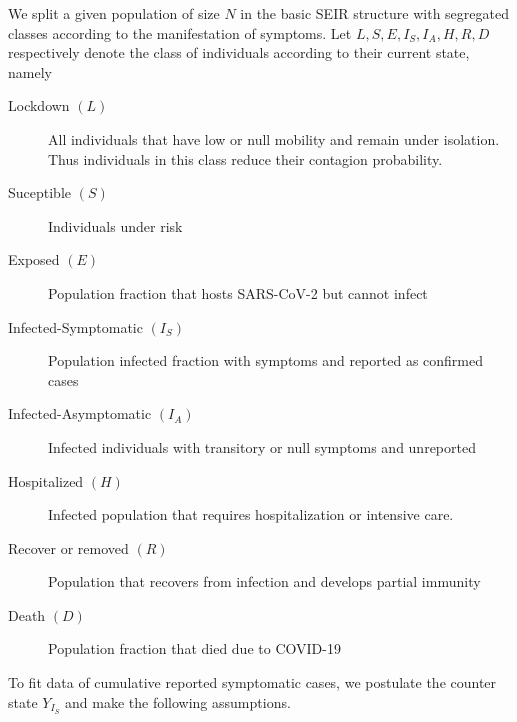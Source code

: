     We split a given population of size $N$ in the basic SEIR
structure with segregated classes according to the manifestation
of symptoms. Let $L, S, E, I_S, I_A, H, R, D$ respectively denote the
class of individuals according to their current state, namely
%
\begin{description}
    \item[Lockdown $(L)$]
        All individuals that have low or null mobility and remain under
        isolation. Thus individuals in this class reduce their contagion probability.
    \item[Suceptible $(S)$]
        Individuals under risk
    \item[Exposed $(E)$]
        Population fraction that hosts SARS-CoV-2 but cannot infect
    \item[Infected-Symptomatic $(I_S)$]
        Population infected fraction with symptoms and reported as confirmed
        cases
    \item[Infected-Asymptomatic $(I_A)$]
        Infected individuals with transitory or null symptoms and unreported
    \item[Hospitalized $(H)$]
        Infected population that requires hospitalization or intensive care.
    \item[Recover or removed $(R)$]
        Population that recovers from infection and develops partial immunity
    \item[Death $(D)$]
        Population fraction that died due to COVID-19
\end{description}
%
To fit data of cumulative reported symptomatic cases, we
postulate the counter state $Y_{I_S}$ and make the following assumptions.
%
%
